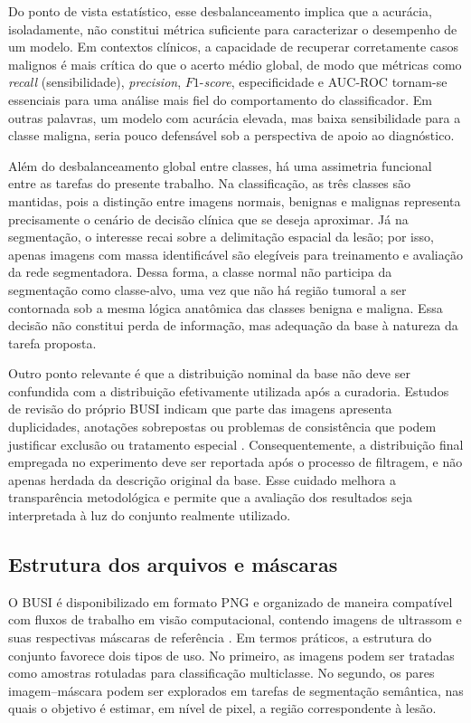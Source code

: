 \documentclass[tcc,capa]{texufpel}
\begin{document}
Do ponto de vista estatístico, esse desbalanceamento implica que a acurácia, isoladamente, não constitui métrica suficiente para caracterizar o desempenho de um modelo. Em contextos clínicos, a capacidade de recuperar corretamente casos malignos é mais crítica do que o acerto médio global, de modo que métricas como \textit{recall} (sensibilidade), \textit{precision}, \(F1\)-\textit{score}, especificidade e AUC-ROC tornam-se essenciais para uma análise mais fiel do comportamento do classificador. Em outras palavras, um modelo com acurácia elevada, mas baixa sensibilidade para a classe maligna, seria pouco defensável sob a perspectiva de apoio ao diagnóstico.

Além do desbalanceamento global entre classes, há uma assimetria funcional entre as tarefas do presente trabalho. Na classificação, as três classes são mantidas, pois a distinção entre imagens normais, benignas e malignas representa precisamente o cenário de decisão clínica que se deseja aproximar. Já na segmentação, o interesse recai sobre a delimitação espacial da lesão; por isso, apenas imagens com massa identificável são elegíveis para treinamento e avaliação da rede segmentadora. Dessa forma, a classe normal não participa da segmentação como classe-alvo, uma vez que não há região tumoral a ser contornada sob a mesma lógica anatômica das classes benigna e maligna. Essa decisão não constitui perda de informação, mas adequação da base à natureza da tarefa proposta.

Outro ponto relevante é que a distribuição nominal da base não deve ser confundida com a distribuição efetivamente utilizada após a curadoria. Estudos de revisão do próprio BUSI indicam que parte das imagens apresenta duplicidades, anotações sobrepostas ou problemas de consistência que podem justificar exclusão ou tratamento especial \cite{Pawlowska2023}. Consequentemente, a distribuição final empregada no experimento deve ser reportada após o processo de filtragem, e não apenas herdada da descrição original da base. Esse cuidado melhora a transparência metodológica e permite que a avaliação dos resultados seja interpretada à luz do conjunto realmente utilizado.

\subsection{Estrutura dos arquivos e máscaras}

O BUSI é disponibilizado em formato PNG e organizado de maneira compatível com fluxos de trabalho em visão computacional, contendo imagens de ultrassom e suas respectivas máscaras de referência \cite{AlDhabyani2020}. Em termos práticos, a estrutura do conjunto favorece dois tipos de uso. No primeiro, as imagens podem ser tratadas como amostras rotuladas para classificação multiclasse. No segundo, os pares imagem--máscara podem ser explorados em tarefas de segmentação semântica, nas quais o objetivo é estimar, em nível de pixel, a região correspondente à lesão.
\end{document}
